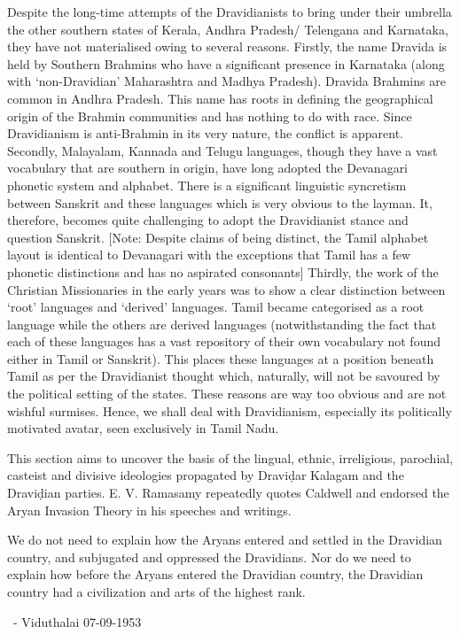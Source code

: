Despite the long-time attempts of the Dravidianists to bring under their umbrella the other southern states of Kerala, Andhra Pradesh/ Telengana and Karnataka, they have not materialised owing to several reasons. Firstly, the name Dravida is held by Southern Brahmins who have a significant presence in Karnataka (along with ‘non-Dravidian’ Maharashtra and Madhya Pradesh). Dravida Brahmins are common in Andhra Pradesh. This name has roots in defining the geographical origin of the Brahmin communities and has nothing to do with race. Since Dravidianism is anti-Brahmin in its very nature, the conflict is apparent. Secondly, Malayalam, Kannada and Telugu languages, though they have a vast vocabulary that are southern in origin, have long adopted the Devanagari phonetic system and alphabet. There is a significant linguistic syncretism between Sanskrit and these languages which is very obvious to the layman. It, therefore, becomes quite challenging to adopt the Dravidianist stance and question Sanskrit. [Note: Despite claims of being distinct, the Tamil alphabet layout is identical to Devanagari with the exceptions that Tamil has a few phonetic distinctions and has no aspirated consonants] Thirdly, the work of the Christian Missionaries in the early years was to show a clear distinction between ‘root’ languages and ‘derived’ languages. Tamil became categorised as a root language while the others are derived languages (notwithstanding the fact that each of these languages has a vast repository of their own vocabulary not found either in Tamil or Sanskrit). This places these languages at a position beneath Tamil as per the Dravidianist thought which, naturally, will not be savoured by the political setting of the states. These reasons are way too obvious and are not wishful surmises. Hence, we shall deal with Dravidianism, especially its politically motivated avatar, seen exclusively in Tamil Nadu.

This section aims to uncover the basis of the lingual, ethnic, irreligious, parochial, casteist and divisive ideologies propagated by Draviḍar Kalagam and the Draviḍian parties. E. V. Ramasamy repeatedly quotes Caldwell and endorsed the Aryan Invasion Theory in his speeches and writings.

\begin{myquote}
We do not need to explain how the Aryans entered and settled in the Dravidian country, and subjugated and oppressed the Dravidians. Nor do we need to explain how before the Aryans entered the Dravidian country, the Dravidian country had a civilization and arts of the highest rank.

~\hfill - Viduthalai 07-09-1953
\end{myquote}

